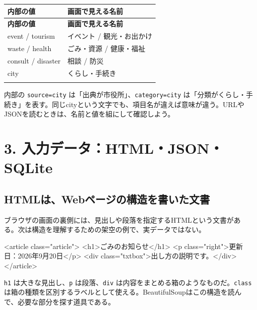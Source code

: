 \documentclass[a4paper,10pt]{ltjsarticle}
\begin{document}
{\small\begin{longtable}{@{}>{\raggedright\arraybackslash}p{}>{\raggedright\arraybackslash}p{}@{}}

\rowcolor{Pale}\textbf{内部の値} & \textbf{画面で見える名前} \\ \midrule

\endfirsthead

\rowcolor{Pale}\textbf{内部の値} & \textbf{画面で見える名前} \\ \midrule\endhead

event / tourism & イベント / 観光・お出かけ \\ \addlinespace[3pt]

waste / health & ごみ・資源 / 健康・福祉 \\ \addlinespace[3pt]

consult / disaster & 相談 / 防災 \\ \addlinespace[3pt]

city & くらし・手続き \\ \addlinespace[3pt]

\bottomrule\end{longtable}}

内部の \nolinkurl{source=city} は「出典が市役所」、\nolinkurl{category=city} は「分類がくらし・手続き」を表す。同じcityという文字でも、項目名が違えば意味が違う。URLやJSONを読むときは、名前と値を組にして確認しよう。


\clearpage

\section*{3. 入力データ：HTML・JSON・SQLite}

\subsection*{HTMLは、Webページの構造を書いた文書}

ブラウザの画面の裏側には、見出しや段落を指定するHTMLという文書がある。次は構造を理解するための架空の例で、実データではない。


\begin{Code}
<article class="article">
  <h1>ごみのお知らせ</h1>
  <p class="right">更新日：2026年9月20日</p>
  <div class="txtbox">出し方の説明です。</div>
</article>
\end{Code}

\nolinkurl{h1} は大きな見出し、\nolinkurl{p} は段落、\nolinkurl{div} は内容をまとめる箱のようなものだ。\nolinkurl{class} は箱の種類を区別するラベルとして使える。BeautifulSoupはこの構造を読んで、必要な部分を探す道具である。
\end{document}
